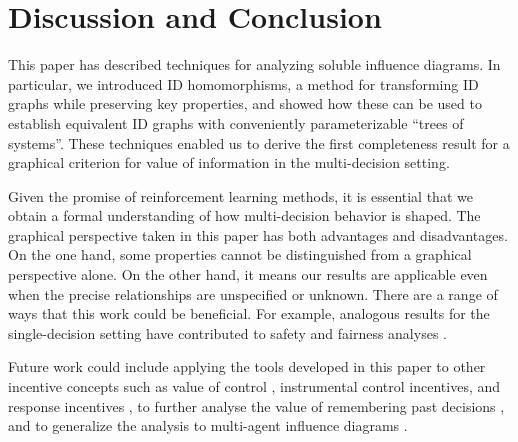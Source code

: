 






\section{Discussion and Conclusion} \label{sec:discussion}


This paper has described techniques for analyzing soluble influence diagrams.
In particular, we introduced ID homomorphisms, a method for transforming ID graphs while preserving key properties, and showed how these can be used to establish equivalent ID graphs with conveniently parameterizable ``trees of systems''.
These techniques enabled us to derive the first completeness result for a graphical criterion for value of information in the multi-decision setting.

Given the promise of reinforcement learning methods, it is essential that we obtain a formal understanding of how multi-decision behavior is shaped.
The graphical perspective taken in this paper has both advantages and disadvantages. On the one hand, some properties cannot be 
distinguished from a graphical perspective alone. On the other hand, it means our results are applicable even when the precise relationships are unspecified or unknown. 
There are a range of ways that this work could be beneficial.
For example, analogous results for the single-decision setting have contributed to safety and fairness analyses
\citep{Armstrong2020pitfalls,cohen2020unambitious,everitt2019tampering,Everitt2019modeling,langlois2021rl,Everitt2021agent}.~

Future work could include applying the tools developed in this paper to other incentive concepts such as value of control \citep{shachter1986evaluating}, instrumental control incentives, and response incentives \citep{Everitt2021agent}, 
to further analyse the value of remembering past decisions
\citep{Shachter2016,lee2020characterizing},
and to generalize the analysis to multi-agent influence diagrams \citep{Hammond2021equilibrium,Koller2003}.









